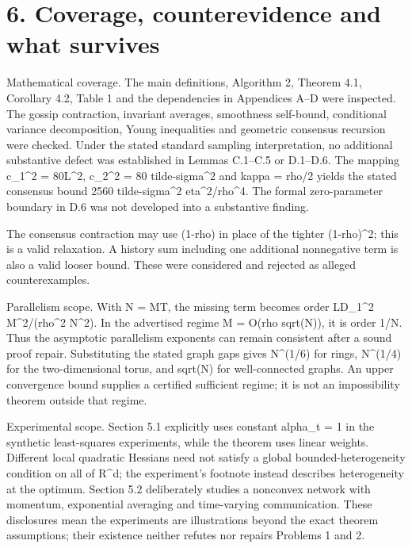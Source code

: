 \documentclass[10pt]{article}
\begin{document}
\section*{6. Coverage, counterevidence and what survives}
Mathematical coverage. The main definitions, Algorithm 2, Theorem 4.1, Corollary 4.2, Table 1 and the dependencies in Appendices A–D were inspected. The gossip contraction, invariant averages, smoothness self-bound, conditional variance decomposition, Young inequalities and geometric consensus recursion were checked. Under the stated standard sampling interpretation, no additional substantive defect was established in Lemmas C.1–C.5 or D.1–D.6. The mapping c\_1\textasciicircum{}2 = 80L\textasciicircum{}2, c\_2\textasciicircum{}2 = 80 tilde-sigma\textasciicircum{}2 and kappa = rho/2 yields the stated consensus bound 2560 tilde-sigma\textasciicircum{}2 eta\textasciicircum{}2/rho\textasciicircum{}4. The formal zero-parameter boundary in D.6 was not developed into a substantive finding.\par
The consensus contraction may use (1-rho) in place of the tighter (1-rho)\textasciicircum{}2; this is a valid relaxation. A history sum including one additional nonnegative term is also a valid looser bound. These were considered and rejected as alleged counterexamples.\par
Parallelism scope. With N = MT, the missing term becomes order LD\_1\textasciicircum{}2 M\textasciicircum{}2/(rho\textasciicircum{}2 N\textasciicircum{}2). In the advertised regime M = O(rho sqrt(N)), it is order 1/N. Thus the asymptotic parallelism exponents can remain consistent after a sound proof repair. Substituting the stated graph gaps gives N\textasciicircum{}(1/6) for rings, N\textasciicircum{}(1/4) for the two-dimensional torus, and sqrt(N) for well-connected graphs. An upper convergence bound supplies a certified sufficient regime; it is not an impossibility theorem outside that regime.\par
Experimental scope. Section 5.1 explicitly uses constant alpha\_t = 1 in the synthetic least-squares experiments, while the theorem uses linear weights. Different local quadratic Hessians need not satisfy a global bounded-heterogeneity condition on all of R\textasciicircum{}d; the experiment’s footnote instead describes heterogeneity at the optimum. Section 5.2 deliberately studies a nonconvex network with momentum, exponential averaging and time-varying communication. These disclosures mean the experiments are illustrations beyond the exact theorem assumptions; their existence neither refutes nor repairs Problems 1 and 2.\par
\end{document}
